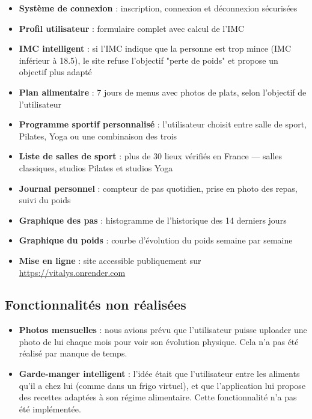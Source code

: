 \documentclass[a4paper, 12pt, twoside]{article}
\begin{document}
\begin{itemize}
    \item[\checkmark] \textbf{Système de connexion} : inscription, connexion et déconnexion sécurisées
    \item[\checkmark] \textbf{Profil utilisateur} : formulaire complet avec calcul de l'IMC
    \item[\checkmark] \textbf{IMC intelligent} : si l'IMC indique que la personne est trop mince (IMC inférieur à 18.5), le site refuse l'objectif "perte de poids" et propose un objectif plus adapté
    \item[\checkmark] \textbf{Plan alimentaire} : 7 jours de menus avec photos de plats, selon l'objectif de l'utilisateur
    \item[\checkmark] \textbf{Programme sportif personnalisé} : l'utilisateur choisit entre salle de sport, Pilates, Yoga ou une combinaison des trois
    \item[\checkmark] \textbf{Liste de salles de sport} : plus de 30 lieux vérifiés en France — salles classiques, studios Pilates et studios Yoga
    \item[\checkmark] \textbf{Journal personnel} : compteur de pas quotidien, prise en photo des repas, suivi du poids
    \item[\checkmark] \textbf{Graphique des pas} : histogramme de l'historique des 14 derniers jours
    \item[\checkmark] \textbf{Graphique du poids} : courbe d'évolution du poids semaine par semaine
    \item[\checkmark] \textbf{Mise en ligne} : site accessible publiquement sur \url{https://vitalys.onrender.com}
\end{itemize}

\subsection{Fonctionnalités non réalisées}

\begin{itemize}
    \item[\textbf{$\times$}] \textbf{Photos mensuelles} : nous avions prévu que l'utilisateur puisse uploader une photo de lui chaque mois pour voir son évolution physique. Cela n'a pas été réalisé par manque de temps.
    \item[\textbf{$\times$}] \textbf{Garde-manger intelligent} : l'idée était que l'utilisateur entre les aliments qu'il a chez lui (comme dans un frigo virtuel), et que l'application lui propose des recettes adaptées à son régime alimentaire. Cette fonctionnalité n'a pas été implémentée.
\end{itemize}
\end{document}
